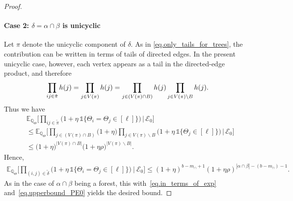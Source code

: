\documentclass[11pt, letterpaper]{article}
\numberwithin{equation}{section}
\newcommand{\E}{\mathbb{E}}
\newcommand{\QQ}{\mathbb{Q}}
\begin{document}
\begin{proof}
\paragraph*{Case 2: $\delta=\alpha \cap \beta$ is unicyclic}
%
Let $\pi$ denote the unicyclic component of $\delta$. As in
\eqref{eq.only_tails_for_trees}, the contribution can be written in terms of tails of directed edges. In the present unicyclic case, however, each vertex
appears as a tail in the directed-edge product, and therefore
%
\begin{align}\label{eq.only_unicyclic}\notag
\prod_{ij\in \tilde{\pi} } h(j) = \prod_{j \in V(\pi)} h(j) = 
\prod_{j\in (V(\pi) \cap B) } h(j) \prod_{j\in V(\pi) \backslash B} h(j).
\end{align}
%
Thus we have
\begin{align*}
& \E_{\QQ_\Theta}\bigg[
\prod_{ij\in \tilde{\pi} } \Big(1+\eta\,\mathds{1}\{\Theta_i=\Theta_j\in[\ell]\} \Big) \, \Big| \, \mathcal E_0 \bigg]\\
&\le \E_{\QQ_\Theta}\bigg[\prod_{j\in (V(\pi) \cap B)   } \Big(1+\eta \Big) \prod_{j\in V(\pi) \backslash B} \Big(1+\eta\,\mathds{1}\{\Theta_j\in[\ell]\} \Big) \, \Big| \, \mathcal E_0\bigg]\\
&\leq \Big(1+\eta \Big)^{|V(\pi)\cap B|}   \Big(1+\eta\rho \Big)^{|V(\pi) \backslash B|}.
\end{align*}
Hence,
\begin{align*}
 \E_{\QQ_\Theta}\bigg[
\prod_{(i,j)\in \tilde{\delta}} \Big(1+\eta\,\mathds{1}\{\Theta_i=\Theta_j\in[\ell]\}\Big)
\ \Big|\ \mathcal E_0\bigg]\leq (1+\eta)^{b-m_\cap+1}(1+\eta \rho)^{|\alpha\cap \beta|-(b-m_\cap)-1}.
\end{align*}
%
As in the case of $\alpha\cap\beta$ being a forest, this with~\eqref{eq.in_terms_of_exp} and~\eqref{eq.upperbound_PE0} yields the desired bound.\end{proof}
%
\end{document}
